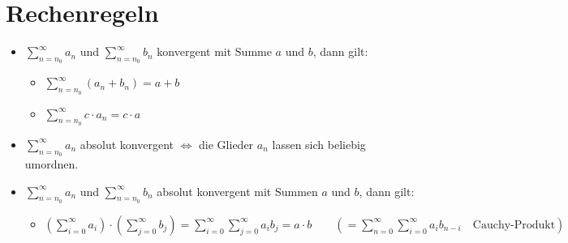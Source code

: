 \section{Rechenregeln}
\begin{itemize}
\item $\sum_{n=n_0}^\infty a_n$ und $\sum_{n=n_0}^\infty b_n$ konvergent mit Summe $a$ und $b$, dann gilt: 
\begin{itemize}
\item $\sum_{n=n_0}^\infty (a_n+b_n)= a + b$
\item $\sum_{n=n_0}^\infty c\cdot a_n= c\cdot a$
\end{itemize}
\item $\sum_{n=n_0}^\infty a_n$ absolut konvergent $\Leftrightarrow$ die Glieder $a_n$ lassen sich beliebig umordnen.
\item $\sum_{n=n_0}^\infty a_n$ und $\sum_{n=n_0}^\infty b_n$ absolut konvergent mit Summen $a$ und $b$, dann gilt:
\begin{itemize}
\item $\left(\sum_{i=0}^\infty a_i\right)\cdot \left( \sum_{j=0}^\infty b_j\right)=\sum_{i=0}^\infty  \sum_{j=0}^\infty a_i b_j=a\cdot b \qquad \left( =\sum_{n=0}^\infty  \sum_{i=0}^\infty a_i b_{n-i} \quad \text{Cauchy-Produkt}\right)$
\end{itemize}
\end{itemize}
